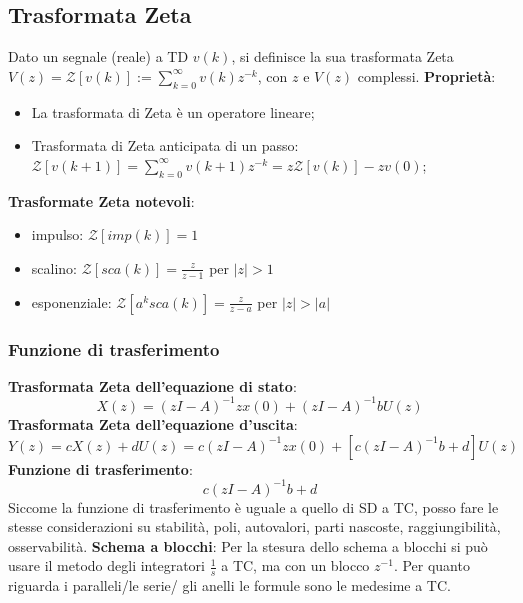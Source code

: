     \subsection{Trasformata Zeta}
    Dato un segnale (reale) a TD $v(k)$, si definisce la sua trasformata Zeta $V(z) = \mathcal{Z}[v(k)] := \sum_{k=0}^{\infty} v(k) z^{-k}$, con $z$ e $V(z)$ complessi.\newline
    \textbf{Proprietà}:
    \begin{itemize}
        \item La trasformata di Zeta è un operatore lineare;
        \item Trasformata di Zeta anticipata di un passo: $\mathcal{Z}[v(k+1)] = \sum_{k=0}^{\infty} v(k+1) z^{-k} = z \mathcal{Z}[v(k)] - z v(0)$;
    \end{itemize}
    \textbf{Trasformate Zeta notevoli}:
    \begin{itemize}
        \item impulso: $\mathcal{Z}[imp(k)] = 1$
        \item scalino: $\mathcal{Z}[sca(k)] = \frac{z}{z-1}$ per $|z|>1$
        \item esponenziale: $\mathcal{Z}[a^k sca(k)] = \frac{z}{z-a}$ per $|z| > |a|$
    \end{itemize}
    \subsubsection{Funzione di trasferimento}
    \textbf{Trasformata Zeta dell'equazione di stato}:
    \[
        X(z) = (zI-A)^{-1} z x(0) + (zI-A)^{-1} b U(z)
    \]
    \textbf{Trasformata Zeta dell'equazione d'uscita}:
    \[
        Y(z) = cX(z) + dU(z) = c(zI-A)^{-1} z x(0) + [c(zI-A)^{-1} b + d] U(z)
    \]
    \textbf{Funzione di trasferimento}:
    \[
        c(zI-A)^{-1} b + d
    \]
    Siccome la funzione di trasferimento è uguale a quello di SD a TC, posso fare le stesse considerazioni su stabilità, poli, autovalori, parti nascoste, raggiungibilità, osservabilità.\newline
    \newline
    \textbf{Schema a blocchi}:\newline
    Per la stesura dello schema a blocchi si può usare il metodo degli integratori $\frac{1}{s}$ a TC, ma con un blocco $z^{-1}$.\newline
    Per quanto riguarda i paralleli/le serie/ gli anelli le formule sono le medesime a TC. 
